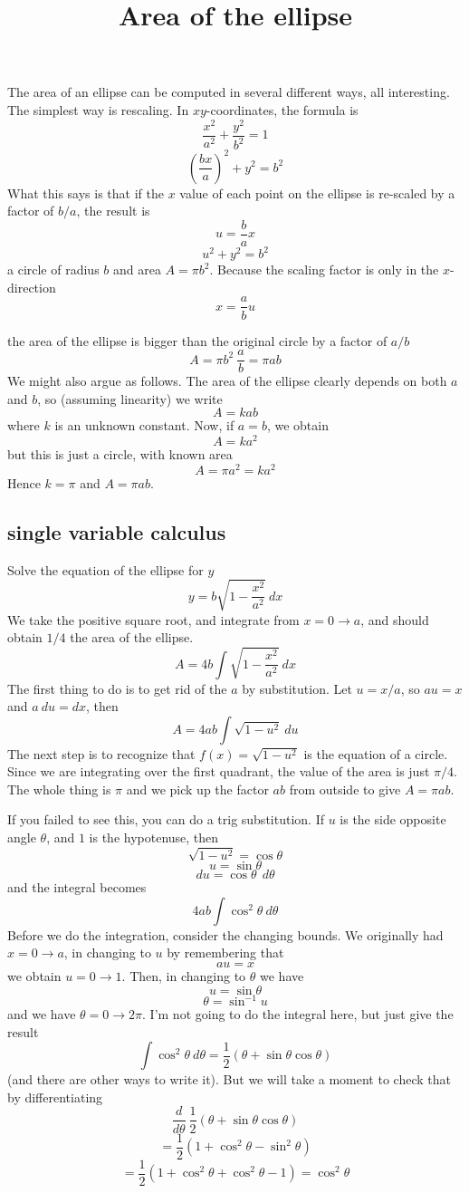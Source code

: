 \documentclass[11pt, oneside]{article}
\title{Area of the ellipse}
\date{}
\begin{document}
\maketitle
\Large


The area of an ellipse can be computed in several different ways, all interesting.  The simplest way is rescaling.  In $xy$-coordinates, the formula is
\[ \frac{x^2}{a^2} + \frac{y^2}{b^2} = 1 \]
\[ (\frac{bx}{a})^2 + y^2 = b^2 \]
What this says is that if the $x$ value of each point on the ellipse is re-scaled by a factor of $b/a$, the result is
\[ u = \frac{b}{a}x \]
\[ u^2 + y^2 = b^2 \]
a circle of radius $b$ and area $A = \pi b^2$.  Because the scaling factor is only in the $x$-direction
\[ x = \frac{a}{b}u \]

the area of the ellipse is bigger than the original circle by a factor of $a/b$
\[ A = \pi b^2 \ \frac{a}{b} = \pi ab \]
We might also argue as follows.  The area of the ellipse clearly depends on both $a$ and $b$, so (assuming linearity) we write
\[ A = k a b \]
where $k$ is an unknown constant.  Now, if $a=b$, we obtain
\[ A = k a^2 \]
but this is just a circle, with known area
\[ A = \pi a^2 = k a^2 \]
Hence $k = \pi$ and $A = \pi ab$.

\subsection*{single variable calculus}
Solve the equation of the ellipse for $y$
\[ y = b \sqrt{1 - \frac{x^2}{a^2} } \ dx  \]
We take the positive square root, and integrate from $x = 0 \rightarrow a$, and should obtain $1/4$ the area of the ellipse.
\[ A = 4 b \int \sqrt{1 - \frac{x^2}{a^2} }  \ dx \]
The first thing to do is to get rid of the $a$ by substitution.  Let $u = x/a$, so $au = x$ and $a \ du = dx$, then
\[ A = 4 ab \int \sqrt{1 - u^2} \ du  \]
The next step is to recognize that $f(x) = \sqrt{1-u^2}$ is the equation of a circle.  Since we are integrating over the first quadrant, the value of the area is just $\pi/4$.  The whole thing is $\pi$ and we pick up the factor $ab$ from outside to give $A = \pi ab$.

If you failed to see this, you can do a trig substitution.  If $u$ is the side opposite angle $\theta$, and $1$ is the hypotenuse, then 
\[ \sqrt{1-u^2} = \cos \theta \]
\[ u = \sin \theta \]
\[ du = \cos \theta \ \ d\theta \]
and the integral becomes
\[ 4 ab \int \cos^2 \theta \ d\theta  \]
Before we do the integration, consider the changing bounds.  We originally had $x = 0 \rightarrow a$, in changing to $u$ by remembering that
\[ au = x \]
we obtain $u = 0 \rightarrow 1$.  Then, in changing to $\theta$ we have
\[ u = \sin \theta \]
\[ \theta = \sin^{-1} u \]
and we have $\theta = 0 \rightarrow 2\pi$.
I'm not going to do the integral here, but just give the result
\[ \int \cos^2 \theta \ d \theta = \frac{1}{2} (\theta + \sin \theta \cos \theta) \]
(and there are other ways to write it).  But we will take a moment to check that by differentiating
\[ \frac{d}{d \theta} \ \frac{1}{2} (\theta + \sin \theta \cos \theta) \]
\[ =  \frac{1}{2}(1 + \cos^2 \theta - \sin^2 \theta) \]
\[ =  \frac{1}{2}(1 + \cos^2 \theta + \cos^2 \theta - 1) = \cos^2 \theta \]
\end{document}

